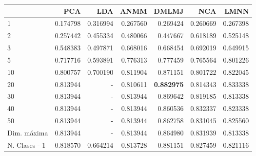 \begin{tabular}{lrrrrrr}
\toprule
{} &       PCA &       LDA &      ANMM &     DMLMJ &       NCA &      LMNN \\
\midrule
1             &  0.174798 &  0.316994 &  0.267560 &  0.269424 &  0.260669 &  0.267398 \\
2             &  0.257442 &  0.455334 &  0.480066 &  0.447667 &  0.618189 &  0.525148 \\
3             &  0.548383 &  0.497871 &  0.668016 &  0.668454 &  0.692019 &  0.649915 \\
5             &  0.717716 &  0.593891 &  0.776313 &  0.777459 &  0.765564 &  0.801226 \\
10            &  0.800757 &  0.700190 &  0.811904 &  0.871151 &  0.801722 &  0.822045 \\
20            &  0.813944 &  -        &  0.810611 &  \textbf{0.882975} &  0.814343 &  0.833338 \\
30            &  0.813944 &  -        &  0.813944 &  0.869642 &  0.819185 &  0.813338 \\
40            &  0.813944 &  -        &  0.813944 &  0.860536 &  0.832337 &  0.823338 \\
50            &  0.813944 &  -        &  0.813944 &  0.862758 &  0.831045 &  0.825560 \\
Dim. máxima   &  0.813944 &  -        &  0.813944 &  0.864980 &  0.831939 &  0.813338 \\
N. Clases - 1 &  0.818570 &  0.664214 &  0.813728 &  0.881151 &  0.827459 &  0.821116 \\
\bottomrule
\end{tabular}
